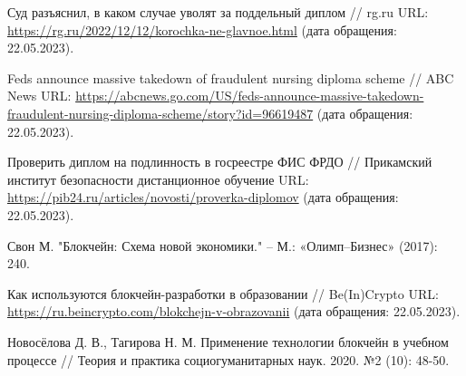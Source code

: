 \documentclass{mirea-article}
\begin{document}
\begin{thebibliography}{99\kern\bibindent}
	 Суд разъяснил, в каком случае уволят за поддельный диплом // rg.ru URL: \url{https://rg.ru/2022/12/12/korochka-ne-glavnoe.html} (дата обращения: 22.05.2023).

	 Feds announce massive takedown of fraudulent nursing diploma scheme // ABC News URL: \url{https://abcnews.go.com/US/feds-announce-massive-takedown-fraudulent-nursing-diploma-scheme/story?id=96619487} (дата обращения: 22.05.2023).

	 Проверить диплом на подлинность в госреестре ФИС ФРДО // Прикамский институт безопасности дистанционное обучение URL: \url{https://pib24.ru/articles/novosti/proverka-diplomov} (дата обращения: 22.05.2023).

	 Свон М. "Блокчейн: Схема новой экономики." – М.: «Олимп–Бизнес» (2017): 240.

	 Как используются блокчейн-разработки в образовании // Be(In)Crypto URL: \url{https://ru.beincrypto.com/blokchejn-v-obrazovanii} (дата обращения: 22.05.2023).

	 Новосёлова Д. В., Тагирова Н. М. Применение технологии блокчейн в учебном процессе // Теория и практика социогуманитарных наук. 2020. №2 (10): 48-50. %
	
\end{thebibliography}
\end{document}

